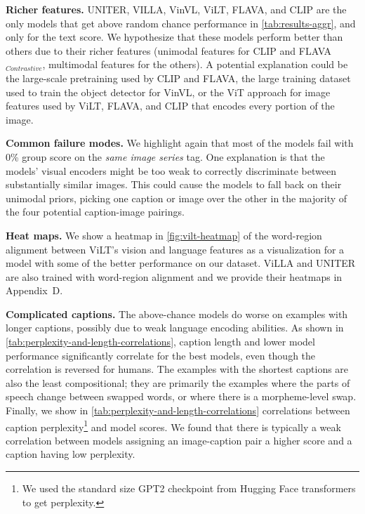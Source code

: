 \documentclass[10pt,twocolumn,letterpaper]{article}
\begin{document}
\textbf{Richer features.} UNITER, VILLA, VinVL, ViLT, FLAVA, and CLIP are the only models that get above random chance performance in \cref{tab:results-aggr}, and only for the text score.
We hypothesize that these models perform better than others due to their richer features (unimodal features for CLIP and FLAVA$_{Contrastive}$, multimodal features for the others).
A potential explanation could be the large-scale pretraining used by CLIP and FLAVA, the large training dataset used to train the object detector for VinVL, or the ViT approach for image features used by ViLT, FLAVA, and CLIP that encodes every portion of the image.


\textbf{Common failure modes.} We highlight again that most of the models fail with 0\% group score on the \textit{same image series} tag.
One explanation is that the models' visual encoders might be too weak to correctly discriminate between substantially similar images. This could cause the models to fall back on their unimodal priors, picking one caption or image over the other in the majority of the four potential caption-image pairings.


\textbf{Heat maps.} We show a heatmap in \cref{fig:vilt-heatmap} of the word-region alignment between ViLT's vision and language features as a visualization for a model with some of the better performance on our dataset. ViLLA and UNITER are also trained with word-region alignment and we provide their heatmaps in Appendix~D.





\textbf{Complicated captions.} The above-chance models do worse on examples with longer captions, possibly due to weak language encoding abilities. As shown in \cref{tab:perplexity-and-length-correlations}, caption length and lower model performance significantly correlate for the best models, even though the correlation is reversed for humans. The examples with the shortest captions are also the least compositional; they are primarily the examples where the parts of speech change between swapped words, or where there is a morpheme-level swap. Finally, we show in \cref{tab:perplexity-and-length-correlations} correlations between caption perplexity\footnote{We used the standard size GPT2 checkpoint from Hugging Face transformers to get perplexity\cite{wolf-etal-2020-transformers}.} and model scores. We found that there is typically a weak correlation between models assigning an image-caption pair a higher score and a caption having low perplexity.
\end{document}
